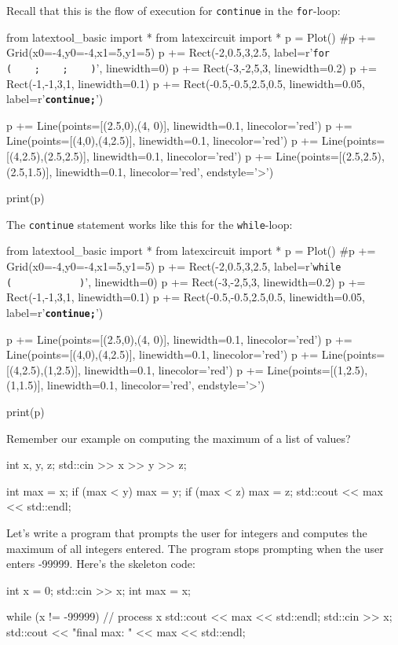 Recall that this is the flow of execution for \texttt{continue} in the \texttt{for}-loop:
\begin{python}
from latextool_basic import *
from latexcircuit import *
p = Plot()
#p += Grid(x0=-4,y0=-4,x1=5,y1=5)
p += Rect(-2,0.5,3,2.5, label=r'\large{\texttt{for  (\ \ \ \ ;\ \ \ \ ;\ \ \ \ )}}', linewidth=0)
p += Rect(-3,-2,5,3, linewidth=0.2)
p += Rect(-1,-1,3,1, linewidth=0.1)
p += Rect(-0.5,-0.5,2.5,0.5, linewidth=0.05, label=r'\texttt{\textbf{continue;}}')


p += Line(points=[(2.5,0),(4, 0)], linewidth=0.1, linecolor='red')
p += Line(points=[(4,0),(4,2.5)], linewidth=0.1, linecolor='red')
p += Line(points=[(4,2.5),(2.5,2.5)], linewidth=0.1, linecolor='red')
p += Line(points=[(2.5,2.5),(2.5,1.5)], linewidth=0.1, linecolor='red', endstyle='>')

print(p)
\end{python}
The \texttt{continue} statement works like this for the \texttt{while}-loop:
\begin{python}
from latextool_basic import *
from latexcircuit import *
p = Plot()
#p += Grid(x0=-4,y0=-4,x1=5,y1=5)
p += Rect(-2,0.5,3,2.5, label=r'\large{\texttt{while  (\ \ \ \ \ \ \ \ \ \ \ \ )}}', linewidth=0)
p += Rect(-3,-2,5,3, linewidth=0.2)
p += Rect(-1,-1,3,1, linewidth=0.1)
p += Rect(-0.5,-0.5,2.5,0.5, linewidth=0.05, label=r'\texttt{\textbf{continue;}}')


p += Line(points=[(2.5,0),(4, 0)], linewidth=0.1, linecolor='red')
p += Line(points=[(4,0),(4,2.5)], linewidth=0.1, linecolor='red')
p += Line(points=[(4,2.5),(1,2.5)], linewidth=0.1, linecolor='red')
p += Line(points=[(1,2.5),(1,1.5)], linewidth=0.1, linecolor='red', endstyle='>')

print(p)
\end{python}

\newpage{}

Remember our example on computing the maximum of a list of values?
\begin{console}
int x, y, z;
std::cin >> x >> y >> z;

int max = x;
if (max < y) max = y;
if (max < z) max = z;
std::cout << max << std::endl;
\end{console}

Let's write a program that prompts the user for integers
and computes the maximum of all integers entered. The program stops
prompting when the user enters -99999. Here's the
skeleton code:
\begin{console}[commandchars=\~\@\$]
int x = 0;
std::cin >> x;
int max = x;

while (x != -99999)
{     
      // process x
      std::cout << max << std::endl;
      std::cin >> x;
}
std::cout << "final max: " << max
          << std::endl;
\end{console}

